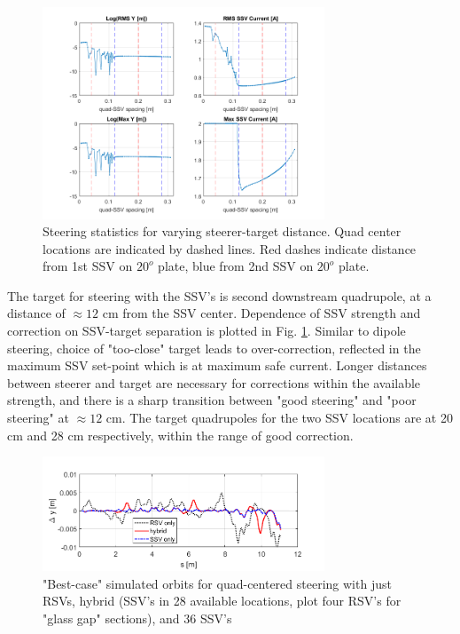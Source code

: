 \begin{figure}[]
\centering
\includegraphics[width=0.75\textwidth]{4.figures/SSV/steering_behaviour_vs_lever_arm_distance.png}
\caption{Steering statistics for varying steerer-target distance. Quad center locations are indicated by dashed lines. Red dashes indicate distance from 1st SSV on $20^o$ plate, blue from 2nd SSV on $20^o$ plate.}
\label{fig:lever_arm}
\end{figure}



The target for steering with the SSV's is second downstream quadrupole, at a distance of $\approx 12$ cm from the SSV center. Dependence of SSV strength and correction on SSV-target separation is plotted in Fig. \ref{fig:lever_arm}. Similar to dipole steering, choice of "too-close" target leads to over-correction, reflected in the maximum SSV set-point which is at maximum safe current. Longer distances between steerer and target are necessary for corrections within the available strength, and there is a sharp transition between "good steering" and "poor steering" at $\approx 12$ cm. The target quadrupoles for the two SSV locations are at 20 cm and 28 cm respectively, within the range of good correction.


\begin{figure}[htb]
\centering
\includegraphics[width=0.75\textwidth]{4.figures/SSV/orbit_uneven_ssvs.png}
\caption{"Best-case" simulated orbits for quad-centered steering with just RSVs, hybrid (SSV's in 28 available locations, plot four RSV's for "glass gap" sections), and 36 SSV's}
\label{fig:SSVsimorbit}
\end{figure}

